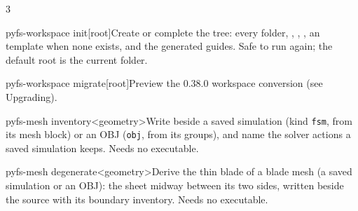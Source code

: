 \begin{multicols}{3}
\begin{cmdblock}{pyfs-workspace init}{[root]}{Create or complete the tree: every  folder, , , , an  template when none exists, and the generated guides. Safe to run again; the default root is the current folder.}
\end{cmdblock}
\begin{cmdblock}{pyfs-workspace migrate}{[root]}{Preview the 0.38.0 workspace conversion (see Upgrading).}
\end{cmdblock}
\begin{cmdblock}{pyfs-mesh inventory}{<geometry>}{Write  beside a saved simulation (kind \texttt{fsm}, from its mesh block) or an OBJ (\texttt{obj}, from its groups), and name the solver actions a saved simulation keeps. Needs no executable.}
\end{cmdblock}
\begin{cmdblock}{pyfs-mesh degenerate}{<geometry>}{Derive the thin blade of a blade mesh (a saved simulation or an OBJ): the sheet midway between its two sides, written beside the source with its boundary inventory. Needs no executable.}
\end{cmdblock}


\end{multicols}
